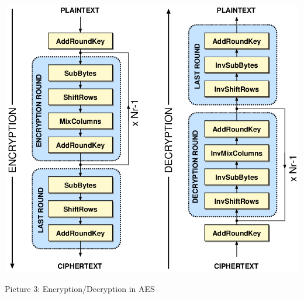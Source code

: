 \begin{center}
\vspace{2cm}
\includegraphics[scale=0.3]{images/aes}

\vspace{0.5cm}
Picture 3: Encryption/Decryption in AES\\
\end{center}